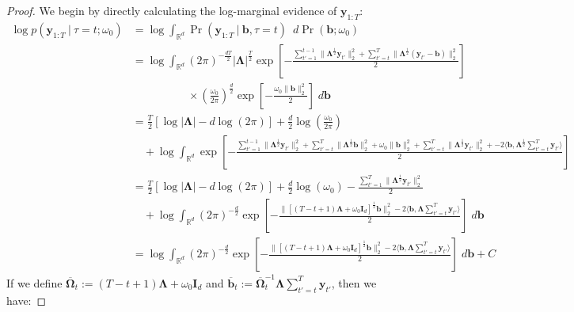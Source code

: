 \begin{proof}
We begin by directly calculating the log-marginal evidence of $\mathbf{y}_{1:T}$: 
\small
\begin{align*}
    \log p(\mathbf{y}_{1:T} \:|\:\tau = t ; \omega_0) &= \log \int_{\mathbb{R}^d} \Pr(\mathbf{y}_{1:T} \:|\:\mathbf{b},\tau = t) \:\; d\Pr(\mathbf{b};\omega_0) \\
    &= \log \int_{\mathbb{R}^d} (2\pi)^{-\frac{dT}{2}}|\boldsymbol{\Lambda}|^\frac{T}{2} \exp\left[-\frac{\sum_{t'=1}^{t-1} \lVert\boldsymbol{\Lambda}^{\frac{1}{2}}\mathbf{y}_{t'}\rVert_2^2 + \sum_{t'=t}^{T} \lVert\boldsymbol{\Lambda}^{\frac{1}{2}}(\mathbf{y}_{t'} - \mathbf{b})\rVert_2^2}{2}\right] \\
    &\quad\quad\quad\quad\quad\times \left(\frac{\omega_0}{2\pi}\right)^{\frac{d}{2}}\exp\left[-\frac{\omega_0\lVert\mathbf{b}\rVert_2^2}{2}\right] \; d\mathbf{b} \\
    &= \frac{T}{2}\left[\log|\boldsymbol{\Lambda}| - d\log(2\pi)\right] + \frac{d}{2}\log \left(\frac{\omega_0}{2\pi}\right)\\
    &\quad + \log \int_{\mathbb{R}^d} \exp\left[-\frac{\sum_{t'=1}^{t-1} \lVert\boldsymbol{\Lambda}^{\frac{1}{2}}\mathbf{y}_{t'}\rVert_2^2 + \sum_{t'=t}^{T} \lVert\boldsymbol{\Lambda}^{\frac{1}{2}}\mathbf{b}\rVert_2^2 +\omega_0 \lVert\mathbf{b}\rVert_2^2 + \sum_{t'=t}^{T} \lVert\boldsymbol{\Lambda}^{\frac{1}{2}}\mathbf{y}_{t'}\rVert_2^2 + -2\langle \mathbf{b}, \boldsymbol{\Lambda}^{\frac{1}{2}} \sum_{t'=t}^T\mathbf{y}_{t'}\rangle}{2}\right] \\
    &=  \frac{T}{2}\left[\log|\boldsymbol{\Lambda}| - d\log(2\pi)\right] + \frac{d}{2}\log \left(\omega_0\right) - \frac{\sum_{t'=1}^T \lVert\boldsymbol{\Lambda}^{\frac{1}{2}}\mathbf{y}_{t'}\rVert_2^2}{2} \\
    &\quad + \log \int_{\mathbb{R}^d} (2\pi)^{-\frac{d}{2}}\exp\left[-\frac{\lVert[(T-t+1)\boldsymbol{\Lambda} + \omega_0\mathbf{I}_d]^{\frac{1}{2}}\mathbf{b}\rVert_2^2-2\langle \mathbf{b}, \boldsymbol{\Lambda} \sum_{t'=t}^T\mathbf{y}_{t'}\rangle}{2}\right] \; d\mathbf{b}\\ 
    &= \log \int_{\mathbb{R}^d} (2\pi)^{-\frac{d}{2}}\exp\left[-\frac{\lVert[(T-t+1)\boldsymbol{\Lambda} + \omega_0\mathbf{I}_d]^{\frac{1}{2}}\mathbf{b}\rVert_2^2-2\langle \mathbf{b}, \boldsymbol{\Lambda} \sum_{t'=t}^T\mathbf{y}_{t'}\rangle}{2}\right] \; d\mathbf{b} + C \tag{$C$ constant independent of $\tau$}
\end{align*}
\normalsize
If we define $\overline{\boldsymbol{\Omega}}_t := (T-t+1)\boldsymbol{\Lambda} + \omega_0\mathbf{I}_d$ and $\overline{\mathbf{b}}_t := \overline{\boldsymbol{\Omega}}_t^{-1} \boldsymbol{\Lambda} \sum_{t'=t}^T \mathbf{y}_{t'}$, then we have:

\end{proof}
